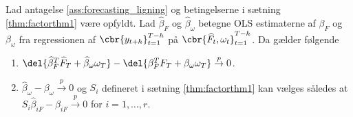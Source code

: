 \begin{thm} \label{thm:factorthm2}
Lad antagelse \ref{ass:forecasting_ligning} og betingelserne i sætning \ref{thm:factorthm1} være opfyldt. 
Lad \(\widehat{\beta}_F\) og \(\widehat{\beta}_\omega\) betegne OLS estimaterne af \(\beta_F\) og \(\beta_\omega\) fra regressionen af \(\cbr{y_{t+h}}_{t=1}^{T-h}\) på \(\cbr{\widehat{F}_t, \omega_t}_{t=1}^{T-h}\). Da gælder følgende
\begin{enumerate}
\item \(\del{\widehat{\beta}_F^T \widehat{F}_T + \widehat{\beta}_\omega \omega_T} - \del{\beta_F^T F_T + \beta_\omega \omega_T} \overset{p}{\rightarrow} 0\).
\item \(\widehat{\beta}_\omega - \beta_\omega \overset{p}{\rightarrow} 0\) og \(S_i\) defineret i sætning \ref{thm:factorthm1} kan vælges således at \(S_i \widehat{\beta}_{iF} - \beta_{iF} \overset{p}{\rightarrow} 0\) for \(i = 1, \ldots, r\).
\end{enumerate}
\end{thm}
%
